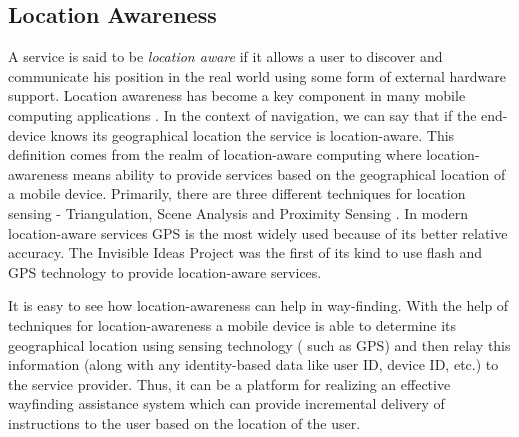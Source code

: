 \documentclass{iitkthesis}
\begin{document}
\subsection{Location Awareness}
A service is said to be \textit{location aware} if it allows a user to 
discover and communicate his position in the real world using some  
form of external hardware support. Location awareness has become 
a key component in many mobile computing applications \cite{parctab}. 
In the context of navigation, we can say that if the end-device knows its 
geographical location the service is location-aware. This definition 
comes from the realm of location-aware computing where location-awareness 
means ability to provide services based on the geographical location of a 
mobile device. Primarily, there are three different techniques for 
location sensing - Triangulation, Scene Analysis and Proximity Sensing 
\cite{hightower}. In modern location-aware services GPS is the 
most widely used because of its better relative accuracy. The Invisible 
Ideas Project \cite{perry} was the first of its kind to use flash and GPS 
technology to provide location-aware services.

It is easy to see how location-awareness can help in way-finding. 
With the help of techniques for location-awareness a mobile device is
able to determine its geographical location using sensing technology (
such as GPS) and then relay this information (along with any 
identity-based data like 
user ID, device ID, etc.) to the service provider. Thus, it can be a platform 
for realizing an effective wayfinding assistance system which can provide 
incremental delivery of instructions to the user based on the location of 
the user. 
\end{document}
